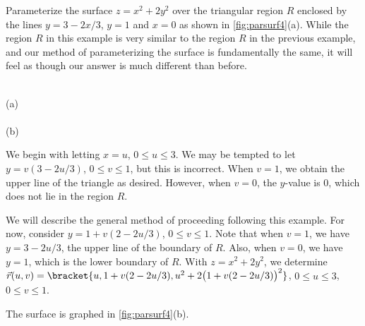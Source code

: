 \begin{example}\label{ex_parsurf4}%
Parameterize the surface $z=x^2+2y^2$ over the triangular region $R$ enclosed by the  lines $y=3-2x/3$, $y=1$ and $x=0$ as shown in \autoref{fig:parsurf4}(a).
\solution
While the region $R$ in this example is very similar to the region $R$ in the previous example, and our method of parameterizing the surface is fundamentally the same, it will feel as though our answer is much different than before.

{
\\[-5pt](a)\\[10pt]
\\(b)}

We begin with letting $x=u$, $0\leq u\leq 3$. We may be tempted to let $y = v(3-2u/3)$, $0\leq v\leq 1$, but this is incorrect. When $v = 1$, we obtain the upper line of the triangle as desired. However, when $v=0$, the $y$-value is 0, which does not lie in the region $R$. 

We will describe the general method of proceeding following this example. For now, consider $y = 1+v(2-2u/3)$, $0\leq v\leq 1$. Note that when $v=1$, we have $y=3-2u/3$, the upper line of the boundary of $R$. Also, when $v=0$, we have $y=1$, which is the lower boundary of $R$. With $z=x^2+2y^2$, we determine $\vec r(u,v) =\bracket{u, 1+v(2-2u/3), u^2+2\bigl(1+v(2-2u/3)\bigr)^2}$, $0\leq u\leq 3$, $0\leq v\leq 1$. 

The surface is graphed in \autoref{fig:parsurf4}(b).
\end{example}

